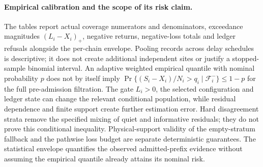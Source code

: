 \paragraph{Empirical calibration and the scope of its risk claim.}
The tables report actual coverage numerators and denominators, exceedance
magnitudes $(L_i-X_i)_+$, negative returns, negative-loss totals and
ledger refusals alongside the per-chain envelope. Pooling records across
delay schedules is descriptive; it does not create additional independent
sites or justify a stopped-sample binomial interval.
An adaptive weighted empirical quantile with nominal probability $p$
does not by itself imply
$\Pr\{(S_i-X_i)/N_i>q_i\mid\mathcal F_i^-\}\leq1-p$
for the full pre-admission filtration. The gate $L_i>0$, the selected
configuration and ledger state can change the relevant conditional
population, while residual dependence and finite support create further
estimation error. Hard disagreement strata remove the specified mixing
of quiet and informative residuals; they do not prove this conditional
inequality. Physical-support validity of the empty-stratum fallback and
the pathwise loss budget are separate deterministic guarantees.
The statistical envelope quantifies the observed admitted-prefix evidence
without assuming the empirical quantile already attains its nominal risk.

